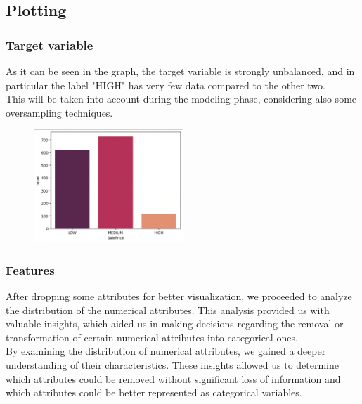 \subsection{Plotting}

\subsubsection*{Target variable}
As it can be seen in the graph, the target variable is strongly unbalanced, and in particular the label "HIGH" has very few data compared to the other two.\\
This will be taken into account during the modeling phase, considering also some oversampling techniques.
\begin{figure}[h!]
    \centering
    \includegraphics[width=0.5\textwidth]{imgs/SalePrice.png}
    \caption{}
    \label{SalePrice distribution}
\end{figure}

\subsubsection*{Features}
After dropping some attributes for better visualization, we proceeded to analyze the distribution of the numerical attributes. This analysis provided us with valuable insights, which aided us in making decisions regarding the removal or transformation of certain numerical attributes into categorical ones. \\
By examining the distribution of numerical attributes, we gained a deeper understanding of their characteristics. These insights allowed us to determine which attributes could be removed without significant loss of information and which attributes could be better represented as categorical variables. \\


